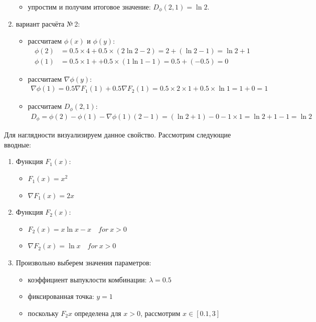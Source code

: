 \documentclass[12pt]{scrartcl}
\begin{document}
\begin{enumerate}
\begin{itemize}
        \item упростим и получим итоговое значение: $D_{\phi}(2,1) = \ln 2$.
    \end{itemize}
    \item вариант расчёта №\,2:
    \begin{itemize}
            \item рассчитаем $\phi(x)$ и $\phi(y)$:
        \begin{align*}
            \phi(2) &= 0.5 \times 4 + 0.5 \times (2\ln2 - 2) = 2 + (\ln2 - 1) = \ln2 +1 \\
            \phi(1) &= 0.5 \times 1 + + 0.5 \times (1\ln1 -1) = 0.5 + (-0.5) = 0
        \end{align*}
        \item рассчитаем $\nabla \phi(y)$:
        \begin{align*}
            \nabla \phi(1) = 0.5 \nabla F_{1}(1) + 0.5 \nabla F_{2}(1) = 0.5 \times 2 \times 1 + 0.5 \times \ln 1  = 1 + 0 = 1
        \end{align*}
        \item рассчитаем $D_{\phi}(2,1)$:
        \begin{align*}
            D_{\phi} = \phi(2) - \phi(1) - \nabla \phi(1)(2 - 1) = (\ln 2 + 1) - 0 - 1 \times 1 = \ln 2 + 1 - 1 = \ln 2
        \end{align*}
    \end{itemize}
\end{enumerate}
Для наглядности визуализируем данное свойство. Рассмотрим следующие вводные:
\begin{enumerate}
    \item Функция $F_{1}(x)$:
    \begin{itemize}
        \item $F_{1}(x) = x^{2}$
        \item $\nabla F_{1}(x) = 2x$
    \end{itemize}
    \item Функция $F_{2}(x)$:
    \begin{itemize}
        \item $F_{2}(x) = x \ln x - x \quad for\ x > 0$
        \item $\nabla F_{2}(x) = \ln x \quad for\ x > 0$
    \end{itemize}
    \item Произвольно выберем значения параметров:
    \begin{itemize}
        \item коэффициент выпуклости комбинации: $\lambda = 0.5$
        \item фиксированная точка: $y = 1$
        \item поскольку $F_{2}x$ определена для $x > 0$, рассмотрим $x \in [0.1,3]$
    \end{itemize}
\end{enumerate}
\end{document}
